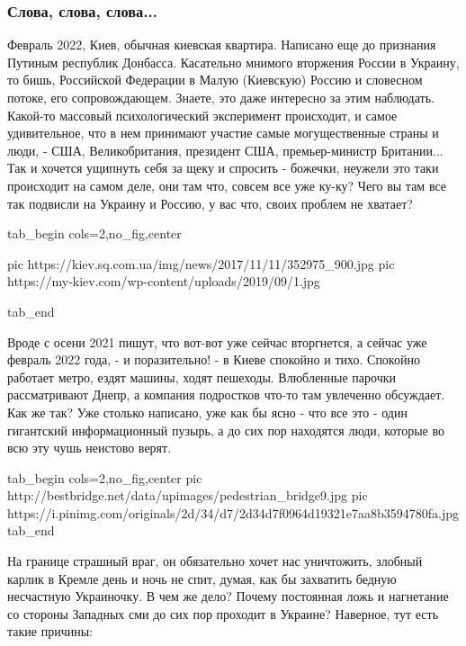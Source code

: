  
 
 
 
 
\clearpage
\subsubsection{Слова, слова, слова...}

Февраль 2022, Киев, обычная киевская квартира. Написано еще до признания
Путиным республик Донбасса. Касательно мнимого вторжения России в Украину, то
бишь, Российской Федерации в Малую (Киевскую) Россию и словесном потоке, его
сопровождающем.  Знаете, это даже интересно за этим наблюдать. Какой-то
массовый психологический эксперимент происходит, и самое удивительное, что в
нем принимают участие самые могущественные страны и люди, - США,
Великобритания, президент США, премьер-министр Британии... Так и хочется
ущипнуть себя за щеку и спросить - божечки, неужели это таки происходит на
самом деле, они там что, совсем все уже ку-ку? Чего вы там все так подвисли на
Украину и Россию, у вас что, своих проблем не хватает?

\ifcmt
  tab_begin cols=2,no_fig,center

     pic https://kiev.sq.com.ua/img/news/2017/11/11/352975_900.jpg
     pic https://my-kiev.com/wp-content/uploads/2019/09/1.jpg

  tab_end
\fi

Вроде с осени 2021 пишут, что вот-вот уже сейчас вторгнется, а сейчас уже
февраль 2022 года, - и поразительно! - в Киеве спокойно и тихо. Спокойно
работает метро, ездят машины, ходят пешеходы. Влюбленные парочки рассматривают
Днепр, а компания подростков что-то там увлеченно обсуждает.  Как же так? Уже
столько написано, уже как бы ясно - что все это - один гигантский
информационный пузырь, а до сих пор находятся люди, которые во всю эту чушь
неистово верят. 

\ifcmt
  tab_begin cols=2,no_fig,center
     pic http://bestbridge.net/data/upimages/pedestrian_bridge9.jpg
     pic https://i.pinimg.com/originals/2d/34/d7/2d34d7f0964d19321e7aa8b3594780fa.jpg
  tab_end
\fi

На границе страшный враг, он обязательно хочет нас уничтожить, злобный карлик в
Кремле день и ночь не спит, думая, как бы захватить бедную несчастную
Украиночку. В чем же дело?  Почему постоянная ложь и нагнетание со стороны
Западных сми до сих пор проходит в Украине? Наверное, тут есть такие причины:

